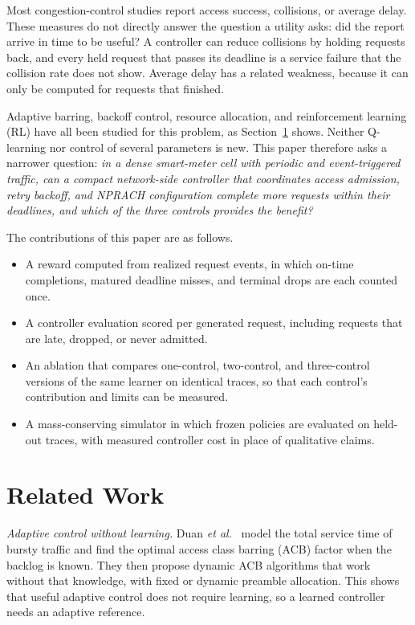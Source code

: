 \documentclass[conference]{IEEEtran}
\begin{document}
Most congestion-control studies report access success, collisions, or average
delay. These measures do not directly answer the question a utility asks: did the
report arrive in time to be useful? A controller can reduce collisions by holding
requests back, and every held request that passes its deadline is a service
failure that the collision rate does not show. Average delay has a related
weakness, because it can only be computed for requests that finished.

Adaptive barring, backoff control, resource allocation, and reinforcement learning
(RL) have all been studied for this problem, as Section~\ref{sec:related} shows.
Neither Q-learning nor control of several parameters is new. This paper therefore
asks a narrower question: \emph{in a dense smart-meter cell with periodic and
event-triggered traffic, can a compact network-side controller that coordinates
access admission, retry backoff, and NPRACH configuration complete more requests
within their deadlines, and which of the three controls provides the benefit?}

The contributions of this paper are as follows.
\begin{itemize}
\item A reward computed from realized request events, in which on-time
completions, matured deadline misses, and terminal drops are each counted once.
\item A controller evaluation scored per generated request, including requests
that are late, dropped, or never admitted.
\item An ablation that compares one-control, two-control, and three-control
versions of the same learner on identical traces, so that each control's
contribution and limits can be measured.
\item A mass-conserving simulator in which frozen policies are evaluated on
held-out traces, with measured controller cost in place of qualitative claims.
\end{itemize}

\section{Related Work}
\label{sec:related}
\emph{Adaptive control without learning.} Duan \emph{et al.}~\cite{duan} model the
total service time of bursty traffic and find the optimal access class barring (ACB)
factor when the backlog is known. They then propose dynamic ACB algorithms that work
without that knowledge, with fixed or dynamic preamble allocation. This shows that
useful adaptive control does not require learning, so a learned controller needs an
adaptive reference.
\end{document}
